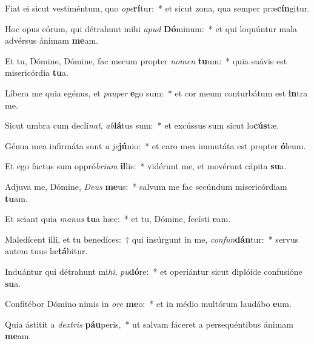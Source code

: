 \item Fiat ei sicut vestiméntum, quo \textit{o}\textit{pe}\textbf{rí}tur:~* et sicut zona, qua semper præ\textbf{cín}gitur.
\item Hoc opus eórum, qui détrahunt mihi \textit{a}\textit{pud} \textbf{Dó}minum:~* et qui loquúntur mala advérsus ánimam \textbf{me}am.
\item Et tu, Dómine, Dómine, fac mecum propter \textit{no}\textit{men} \textbf{tu}um:~* quia suávis est misericórdia \textbf{tu}a.
\item Líbera me quia egénus, et \textit{pau}\textit{per} \textbf{e}go sum:~* et cor meum conturbátum est \textbf{in}tra me.
\item Sicut umbra cum declí\textit{nat}, \textit{ab}\textbf{lá}tus sum:~* et excússus sum sicut lo\textbf{cús}tæ.
\item Génua mea infirmáta sunt \textit{a} \textit{je}\textbf{jú}nio:~* et caro mea immutáta est propter \textbf{ó}leum.
\item Et ego factus sum oppró\textit{bri}\textit{um} \textbf{il}lis:~* vidérunt me, et movérunt cápita \textbf{su}a.
\item Adjuva me, Dómine, \textit{De}\textit{us} \textbf{me}us:~* salvum me fac secúndum misericórdiam \textbf{tu}am.
\item Et sciant quia \textit{ma}\textit{nus} \textbf{tu}a hæc:~* et tu, Dómine, fecísti \textbf{e}am.
\item Maledícent illi, et tu benedíces:~† qui insúrgunt in me, \textit{con}\textit{fun}\textbf{dán}tur:~* servus autem tuus læ\textbf{tá}bitur.
\item Induántur qui détrahunt mi\textit{hi}, \textit{pu}\textbf{dó}re:~* et operiántur sicut diplóide confusióne \textbf{su}a.
\item Confitébor Dómino nimis in \textit{o}\textit{re} \textbf{me}o:~* et in médio multórum laudábo \textbf{e}um.
\item Quia ástitit a \textit{dex}\textit{tris} \textbf{páu}peris,~* ut salvam fáceret a persequéntibus ánimam \textbf{me}am.
